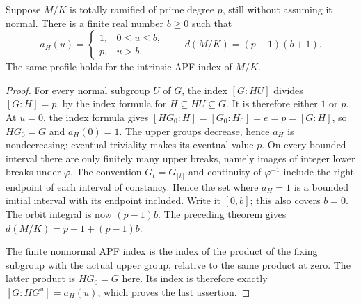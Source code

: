 \begin{corollary}
\label{fw:prime-degree-nonnormal-index-profile}
\leanok
Suppose $M/K$ is totally ramified of prime degree $p$, still without
assuming it normal. There is a finite real number $b\geq0$ such that
\[
 a_H(u)=
 \begin{cases}
 1,&0\leq u\leq b,\\
 p,&u>b,
 \end{cases}
 \qquad
 d(M/K)=(p-1)(b+1).
\]
The same profile holds for the intrinsic APF index of $M/K$.
\end{corollary}
\begin{proof}
For every normal subgroup $U$ of $G$, the index $[G:HU]$ divides
$[G:H]=p$, by the index formula for $H\subseteq HU\subseteq G$.
It is therefore either $1$ or $p$. At $u=0$, the index formula gives
$[HG_0:H]=[G_0:H_0]=e=p=[G:H]$, so $HG_0=G$ and $a_H(0)=1$.
The upper groups decrease, hence
$a_H$ is nondecreasing; eventual triviality makes its eventual value
$p$. On every bounded interval there are only finitely many upper
breaks, namely images of integer lower breaks under $\varphi$.
The convention $G_t=G_{\lceil t\rceil}$ and continuity of
$\varphi^{-1}$ include the right endpoint of each interval of
constancy. Hence the set where $a_H=1$ is a bounded initial interval
with its endpoint included. Write it $[0,b]$; this also covers $b=0$.
The orbit integral is now $(p-1)b$. The preceding theorem gives
$d(M/K)=p-1+(p-1)b$.

The finite nonnormal APF index is the index of the product of the
fixing subgroup with the actual upper group, relative to the same
product at zero. The latter product is $HG_0=G$ here. Its index is
therefore exactly $[G:HG^u]=a_H(u)$, which proves the last assertion.
\end{proof}


